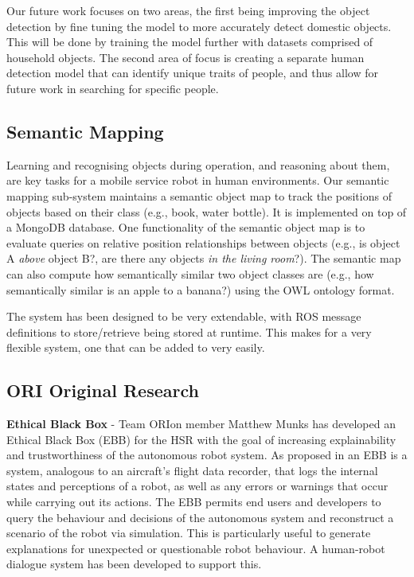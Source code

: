 \documentclass[runningheads,a4paper]{llncs}
\newcommand{\teamori}{Team ORIon}
\begin{document}
Our future work focuses on two areas, the first being improving the object detection by fine tuning the model to more accurately detect domestic objects. This will be done by training the model further with datasets comprised of household objects. The second area of focus is creating a separate human detection model that can identify unique traits of people, and thus allow for future work in searching for specific people.


\subsection{Semantic Mapping}
Learning and recognising objects during operation, and reasoning about them, are key tasks for a mobile service robot in human environments. Our semantic mapping sub-system maintains a semantic object map to track the positions of objects based on their class (e.g., book, water bottle). It is implemented on top of a MongoDB database. One functionality of the semantic object map is to evaluate queries on relative position relationships between objects (e.g., is object A \emph{above} object B?, are there any objects \emph{in the living room}?). The semantic map can also compute how semantically similar two object classes are (e.g., how semantically similar is an apple to a banana?) using the OWL ontology format. 


The system has been designed to be very extendable, with ROS message definitions to store/retrieve being stored at runtime. This makes for a very flexible system, one that can be added to very easily.

\subsection{ORI Original Research}

\textbf{Ethical Black Box} - \teamori{} member Matthew Munks has developed an Ethical Black Box (EBB) for the HSR with the goal of increasing explainability and trustworthiness of the autonomous robot system. As proposed in \cite{winfield2017} an EBB is a system, analogous to an aircraft's flight data recorder, that logs the internal states and perceptions of a robot, as well as any errors or warnings that occur while carrying out its actions. The EBB permits end users and developers to query the behaviour and decisions of the autonomous system and reconstruct a scenario of the robot via simulation. This is particularly useful to generate explanations for unexpected or questionable robot behaviour. A human-robot dialogue system has been developed to support this.
\end{document}
